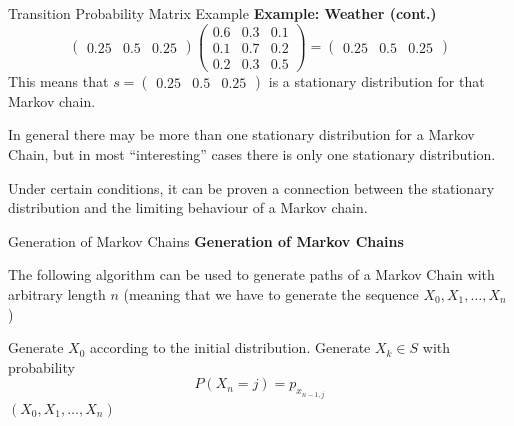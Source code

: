 \documentclass[8pt]{beamer}
\begin{document}
\begin{frame}{Transition Probability Matrix Example}
\textbf{Example: Weather (cont.)}
\begin{equation*}
\left(
\begin{array}{ccc}
0.25 & 0.5& 0.25
\end{array}
\right)
\left( 
\begin{array}{ccc}
0.6&0.3& 0.1 \\
0.1&0.7& 0.2\\
0.2&0.3& 0.5
\end{array}
\right)
=
\left(
\begin{array}{ccc}
0.25 &0.5 &0.25
\end{array}
\right)
\end{equation*}
This means that 
$s=\left(
\begin{array}{ccc}
0.25 &0.5 &0.25
\end{array}
\right)$ 
is a stationary distribution for that Markov chain.

\vspace{3mm}

In general there may be more than one stationary distribution for a Markov Chain, but in most ``interesting'' cases there is only one stationary distribution.

\vspace{2mm}

Under certain conditions, it can be proven a connection between the stationary distribution and the limiting behaviour of a Markov chain. 
\end{frame}

\begin{frame}{Generation of Markov Chains}
\textbf{Generation of Markov Chains}

\vspace{2mm}

The following algorithm can be used to generate paths of a Markov Chain
with arbitrary length $n$ (meaning that we have to generate the sequence $X_0, X_1,\ldots, X_n$) 

\vspace{2mm}

\begin{algorithm}[H]
\caption{Generate a Markov Chain trajectory}
\begin{algorithmic}[1]
    \State Generate $X_0$ according to the initial distribution.
        \State Generate $X_k \in S$ with probability 
        \[
        P(X_{n} = j) = p_{x_{n-1,j}}
        \]
    \EndFor
    \State \Return $(X_0, X_1, \ldots, X_n)$
\end{algorithmic}
\end{algorithm}
\end{frame}
\end{document}
